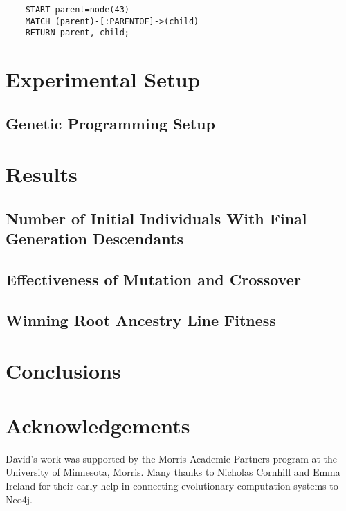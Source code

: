 \documentclass[12pt]{article}
\begin{document}
\begin{verbatim}
    START parent=node(43)
    MATCH (parent)-[:PARENTOF]->(child)
    RETURN parent, child;
\end{verbatim}


\section{Experimental Setup} 
\label{sec:experiments}


\subsection{Genetic Programming Setup}
\label{sec:GPSetup}


\section{Results} \label{sec:results}



\subsection{Number of Initial Individuals With Final Generation Descendants}
\label{sec:numberInitialIndividualsWithDescendants}



\subsection{Effectiveness of Mutation and Crossover}
\label{sec:effectivenessMutationCrossover}



\subsection{Winning Root Ancestry Line Fitness}
\label{sec:WinningRootLineFitness}


\section{Conclusions} \label{sec:conclusion}



\section*{Acknowledgements}

David's work was supported by the Morris Academic Partners program at the University of Minnesota, Morris. Many thanks to Nicholas Cornhill and Emma Ireland for their early help in connecting evolutionary computation systems to Neo4j.

\pagebreak



\end{document}
